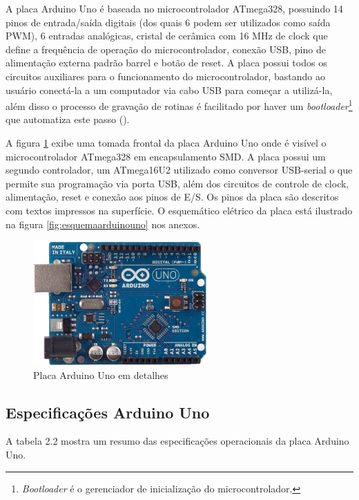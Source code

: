 A placa Arduino Uno é baseada no microcontrolador ATmega328, possuindo 14 pinos de entrada/saída digitais (dos quais 6 podem ser utilizados como saída PWM), 6 entradas analógicas, cristal de cerâmica com 16 MHz de clock que define a frequência de operação do microcontrolador, conexão USB, pino de alimentação externa padrão barrel e botão de reset. A placa possui todos os circuitos auxiliares para o funcionamento do microcontrolador, bastando ao usuário conectá-la a um computador via cabo USB para começar a utilizá-la, além disso o processo de gravação de rotinas é facilitado por haver um \textit{bootloader}\footnote{\textit{Bootloader} é o gerenciador de inicialização do microcontrolador.} que automatiza este passo (\textcite{arduino_specs:2013}).

A figura \ref{fig:arduinouno} exibe uma tomada frontal da placa Arduino Uno onde é visível o microcontrolador ATmega328 em encapsulamento SMD. A placa possui um segundo controlador, um ATmega16U2 utilizado como conversor USB-serial o que permite sua programação via porta USB, além dos circuitos de controle de clock, alimentação, reset e conexão aos pinos de E/S. Os pinos da placa são descritos com textos impressos na superfície. O esquemático elétrico da placa está ilustrado na figura \ref{fig:esquemaarduinouno} nos anexos.
 
\begin{figure}[h!]
			\centering
			\includegraphics[width=0.6\textwidth]{figures/arduinoUnoFront.jpg}
			\caption{Placa Arduino Uno em detalhes}
			\label{fig:arduinouno}
\end{figure}


\subsection{Especificações Arduino Uno}

A tabela 2.2 mostra um resumo das especificações operacionais da placa Arduino Uno.

